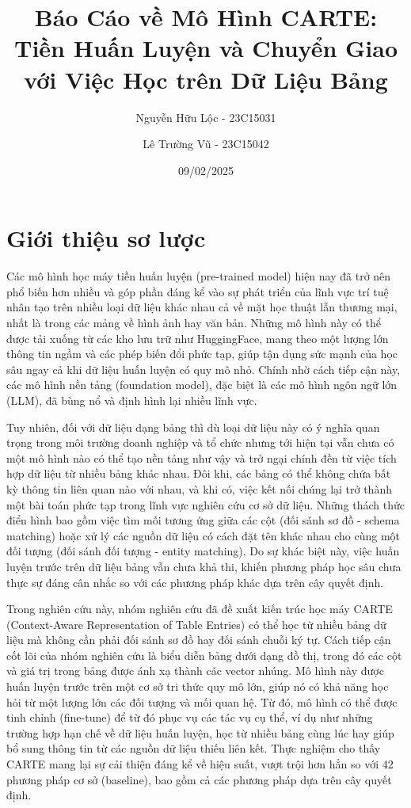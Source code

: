 \documentclass{article}
\title{Báo Cáo về Mô Hình CARTE: Tiền Huấn Luyện và Chuyển Giao với Việc Học trên Dữ Liệu Bảng}
\author{Nguyễn Hữu Lộc - 23C15031 \and Lê Trường Vũ - 23C15042}
\date{09/02/2025}
\begin{document}
\maketitle

\tableofcontents


\section{Giới thiệu sơ lược}
Các mô hình học máy tiền huấn luyện (pre-trained model) hiện nay đã trở nên phổ biến hơn nhiều và góp phần đáng kể vào sự phát triển của lĩnh vực trí tuệ nhân tạo trên nhiều loại dữ liệu khác nhau cả về mặt học thuật lẫn thương mại, nhất là trong các mảng về hình ảnh hay văn bản. Những mô hình này có thể được tải xuống từ các kho lưu trữ như HuggingFace, mang theo một lượng lớn thông tin ngầm và các phép biến đổi phức tạp, giúp tận dụng sức mạnh của học sâu ngay cả khi dữ liệu huấn luyện có quy mô nhỏ. Chính nhờ cách tiếp cận này, các mô hình nền tảng (foundation model), đặc biệt là các mô hình ngôn ngữ lớn (LLM), đã bùng nổ và định hình lại nhiều lĩnh vực.

Tuy nhiên, đối với dữ liệu dạng bảng thì dù loại dữ liệu này có ý nghĩa quan trọng trong môi trường doanh nghiệp và tổ chức nhưng tới hiện tại vẫn chưa có một mô hình nào có thể tạo nền tảng như vậy và trở ngại chính đền từ việc tích hợp dữ liệu từ nhiều bảng khác nhau. Đôi khi, các bảng có thể không chứa bất kỳ thông tin liên quan nào với nhau, và khi có, việc kết nối chúng lại trở thành một bài toán phức tạp trong lĩnh vực nghiên cứu cơ sở dữ liệu. Những thách thức điển hình bao gồm việc tìm mối tương ứng giữa các cột (đối sánh sơ đồ - schema matching) hoặc xử lý các nguồn dữ liệu có cách đặt tên khác nhau cho cùng một đối tượng (đối sánh đối tượng - entity matching). Do sự khác biệt này, việc huấn luyện trước trên dữ liệu bảng vẫn chưa khả thi, khiến phương pháp học sâu chưa thực sự đáng cân nhắc so với các phương pháp khác dựa trên cây quyết định.

Trong nghiên cứu này, nhóm nghiên cứu đã đề xuất kiến trúc học máy CARTE (Context-Aware Representation of Table Entries) có thể học từ nhiều bảng dữ liệu mà không cần phải đối sánh sơ đồ hay đối sánh chuỗi ký tự. Cách tiếp cận cốt lõi của nhóm nghiên cứu là biểu diễn bảng dưới dạng đồ thị, trong đó các cột và giá trị trong bảng được ánh xạ thành các vector nhúng. Mô hình này được huấn luyện trước trên một cơ sở tri thức quy mô lớn, giúp nó có khả năng học hỏi từ một lượng lớn các đối tượng và mối quan hệ. Từ đó, mô hình có thể được tinh chỉnh (fine-tune) để từ đó phục vụ các tác vụ cụ thể, ví dụ như những trường hợp hạn chế về dữ liệu huấn luyện, học từ nhiều bảng cùng lúc hay giúp bổ sung thông tin từ các nguồn dữ liệu thiếu liên kết. Thực nghiệm cho thấy CARTE mang lại sự cải thiện đáng kể về hiệu suất, vượt trội hơn hẳn so với 42 phương pháp cơ sở (baseline), bao gồm cả các phương pháp dựa trên cây quyết định.
\end{document}
